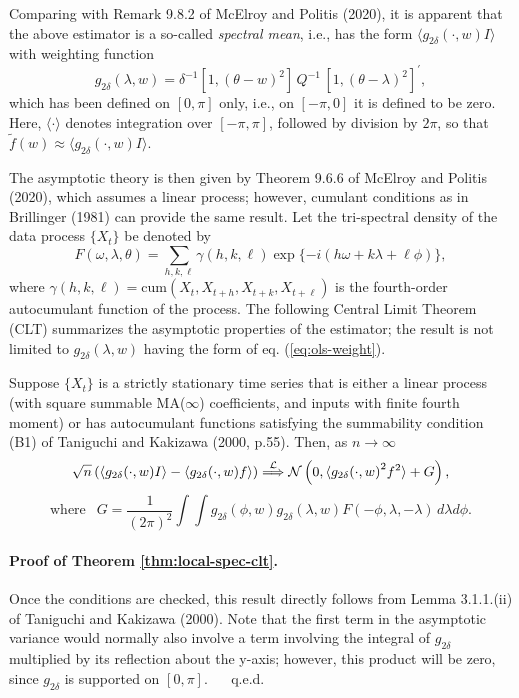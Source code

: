 \documentclass[12p E.Lt,psfig]{article} %
\def\convinlaw{\stackrel{{\cal L}}{\Longrightarrow }}
\def\tends{\rightarrow}
\begin{document}
  Comparing with Remark 9.8.2 of McElroy and Politis (2020),
it is apparent that  the above estimator is a
so-called {\it spectral mean}, i.e., has the form $\langle g_{2 \delta} ( \cdot, w)  I \rangle$
 with weighting function
\begin{equation}
\label{eq:ols-weight}
  g_{2 \delta} ( \lambda, w) =   \delta^{-1} [ 1,  {( \theta  - w)}^2 ] \, Q^{-1}  \,  { [ 1,  {(\theta  - \lambda )}^2  ]}^{\prime},
 \end{equation}
  which has been defined on $[0, \pi]$ only, i.e., on $[-\pi,0]$ it is defined to be zero.
Here,  $\langle \cdot \rangle$ denotes integration over $[- \pi, \pi]$, followed
by  division by $2 \pi$, so that
  $ \tilde f (w) \approx \langle g_{2 \delta} ( \cdot, w)  I \rangle$. 

  The asymptotic theory
  is then given by Theorem 9.6.6 of McElroy and Politis (2020), which assumes a linear process;
   however, cumulant conditions    as in  Brillinger (1981) can provide the same result.
 Let the tri-spectral density of the data process $\{ X_t \}$  be denoted by
\[
   F  (\omega, \lambda, \theta) = \sum_{h,k,\ell}  \gamma (h,k,\ell) \exp \{ -i (h \omega + k \lambda + \ell \phi) \},
\]
   where $\gamma (h,k,\ell) = \mbox{cum} ( X_t, X_{t+h}, X_{t+k}, X_{t+ \ell})$ is the fourth-order
   autocumulant function of the process.   The  following 
Central Limit Theorem (CLT) summarizes the asymptotic properties of 
       the estimator; the result is not limited
to $ g_{2 \delta} ( \lambda, w)$ having the form of eq. (\ref{eq:ols-weight}).

\begin{theorem}
\label{thm:local-spec-clt}
  Suppose $\{ X_t \}$ is a strictly stationary time series that is either a linear process  (with square summable
 MA($\infty$)  coefficients, and inputs with finite fourth moment)  or
   has autocumulant functions satisfying the summability condition (B1) of Taniguchi and Kakizawa (2000, p.55).
   Then, as $n \tends \infty$
\[
   \sqrt{n} \, (   \langle g_{2 \delta} ( \cdot, w)  I \rangle -  \langle g_{2 \delta} ( \cdot, w)  f \rangle )
   \convinlaw \mathcal{N} \left( 0, \langle  { g_{2 \delta}( \cdot, w) }^2 f^2 \rangle
    +  G   \right),
  \]
  \[ \mbox{where } \ \ 
 G=  \frac{1}{   {(2 \pi)}^{2} } \int \int g_{2 \delta}( \phi, w) g_{2 \delta}( \lambda, w)
      F (- \phi, \lambda, -\lambda) \, d\lambda d\phi .
\]
\end{theorem}

\paragraph{Proof of Theorem \ref{thm:local-spec-clt}.}
    Once the conditions are checked, this result directly follows from Lemma 3.1.1.(ii) of Taniguchi and Kakizawa (2000).
    Note that the first term in the asymptotic variance would normally also involve a term involving the integral
     of $g_{2 \delta} $ multiplied by its reflection about the y-axis; however, this product will be zero, since $g_{2 \delta}$
      is supported on $[0, \pi]$.   $\quad $ q.e.d.
\end{document}
